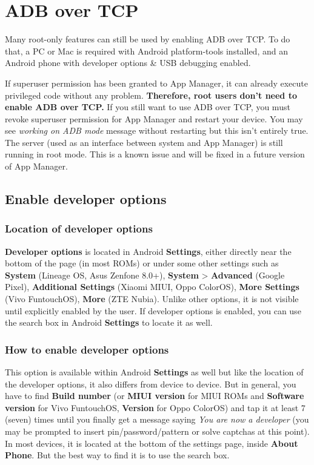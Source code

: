 \section{ADB over TCP}\label{sec:adb-over-tcp}
Many root-only features can still be used by enabling ADB over TCP. To do that, a PC or Mac is required with Android
platform-tools installed, and an Android phone with developer options \& USB debugging enabled.

\begin{tip}
    If superuser permission has been granted to App Manager, it can already execute privileged code without any problem.
    \textbf{Therefore, root users don't need to enable ADB over TCP.} If you still want to use ADB over TCP, you must
    revoke superuser permission for App Manager and restart your device. You may see \textit{working on ADB mode}
    message without restarting but this isn't entirely true. The server (used as an interface between system and App
    Manager) is still running in root mode. This is a known issue and will be fixed in a future version of App Manager.
\end{tip}


\subsection{Enable developer options}\label{subsec:enable-developer-options}

\subsubsection{Location of developer options}\label{subsubsec:location-of-developer-options}
\textbf{Developer options} is located in Android \textbf{Settings}, either directly near the bottom of the page (in most
ROMs) or under some other settings such as \textbf{System} (Lineage OS, Asus Zenfone 8.0+), \textbf{System} >
\textbf{Advanced} (Google Pixel), \textbf{Additional Settings} (Xiaomi MIUI, Oppo ColorOS), \textbf{More Settings} (Vivo
FuntouchOS), \textbf{More} (ZTE Nubia). Unlike other options, it is not visible until explicitly enabled by the user. If
developer options is enabled, you can use the search box in Android \textbf{Settings} to locate it as well.

\subsubsection{How to enable developer options}
This option is available within Android \textbf{Settings} as well but like the location of the developer options, it
also differs from device to device. But in general, you have to find \textbf{Build number} (or \textbf{MIUI version} for
MIUI ROMs and \textbf{Software version} for Vivo FuntouchOS, \textbf{Version} for Oppo ColorOS) and tap it at least 7
(seven) times until you finally get a message saying \textit{You are now a developer} (you may be prompted to insert
pin/password/pattern or solve captchas at this point). In most devices, it is located at the bottom of the settings
page, inside \textbf{About Phone}. But the best way to find it is to use the search box.

